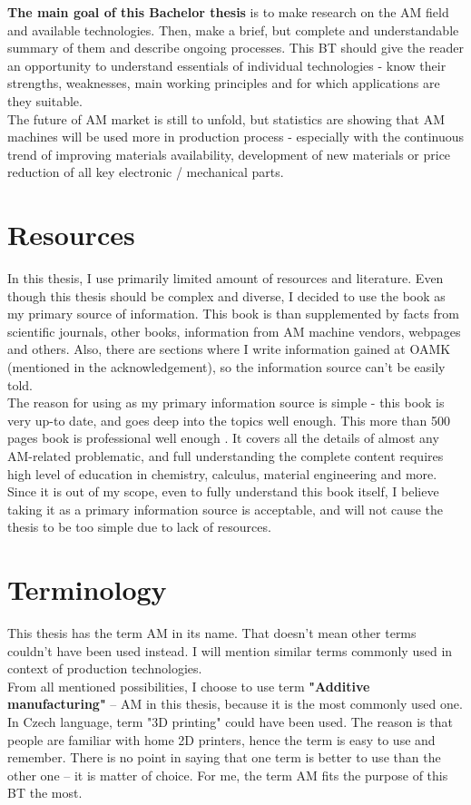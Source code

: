 \documentclass[a4paper, twoside, 11pt]{report}
\begin{document}
\textbf{The main goal of this Bachelor thesis} is to make research on the AM field and available technologies. Then, make a brief, but complete and understandable summary of them and describe ongoing processes. This BT should give the reader an opportunity to understand essentials of individual technologies - know their strengths, weaknesses, main working principles and for which applications are they suitable.\\
The future of AM market is still to unfold, but statistics are showing that AM machines will be used more in production process - especially with the continuous trend of improving materials availability, development of new materials or price reduction of all key electronic / mechanical parts. \newpage
%
\section{Resources}
In this thesis, I use primarily limited amount of resources and literature. Even though this thesis should be complex and diverse, I decided to use the book \cite{AMT} as my primary source of information. This book is than supplemented by facts from scientific journals, other books, information from AM machine vendors, webpages and others. Also, there are sections where I write information gained at OAMK (mentioned in the acknowledgement), so the information source can't be easily told.\\
The reason for using \cite{AMT} as my primary information source is simple - this book is very up-to date, and goes deep into the topics well enough. This more than 500 pages book is professional well enough . It covers all the details of almost any AM-related problematic, and full understanding the complete content requires high level of education in chemistry, calculus, material engineering and more. Since it is out of my scope, even to fully understand this book itself, I believe taking it as a primary information source is acceptable, and will not cause the thesis to be too simple due to lack of resources.
%
\section{Terminology}
This thesis has the term AM in its name. That doesn't mean other terms couldn't have been used instead. I will mention similar terms commonly used in context of production technologies.\\
From all mentioned possibilities, I choose to use term \textbf{"Additive manufacturing"} – AM in this thesis, because it is the most commonly used one. In Czech language, term "3D printing" could have been used. The reason is that people are familiar with home 2D printers, hence the term is easy to use and remember. There is no point in saying that one term is better to use than the other one – it is matter of choice. For me, the term AM fits the purpose of this BT the most.
\end{document}
